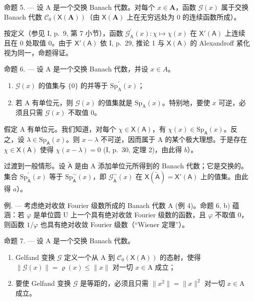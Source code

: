 命题 5. --- 设 A 是一个交换 Banach 代数。对每个 \(x \in \mathbf{A}\)，函数 \(\mathcal{G}(x)\) 属于交换 Banach 代数 \(\mathcal{C}_0(\mathsf{X}(\mathbf{A}))\)（由 \(\mathsf{X}(\mathbf{A})\) 上在无穷远处为 0 的连续函数所成）。

按定义（参见 I, p.~9, 第 7 小节），函数 \(\mathcal{G}_{\mathrm{A}}^{\prime}(x)\colon \chi \mapsto \chi (x)\) 在 \(\mathsf{X}'(\mathsf{A})\) 上连续且在 0 处取值 0。由于 \(\mathsf{X}'(\mathsf{A})\) 依 I, p.~29, 推论 1 与 \(\mathsf{X}(\mathsf{A})\) 的 Alexandroff 紧化视为同一，命题得证。

命题 6. --- 设 A 是一个交换 Banach 代数，并设 \(x \in A\)。

\begin{enumerate}
\def\labelenumi{\alph{enumi})}
\item
  \(\mathcal{G}(x)\) 的值集与 \(\{0\}\) 的并等于 \(\mathrm{Sp}_{\mathrm{A}}^{\prime}(x)\)；
\item
  若 A 有单位元，则 \(\mathcal{G}(x)\) 的值集就是 \(\mathrm{Sp}_{\mathrm{A}}(x)\)。特别地，要使 \(x\) 可逆，必须且只需 \(\mathcal{G}(x)\) 不取值 0。
\end{enumerate}

假定 A 有单位元。我们知道，对每个 \(\chi \in \mathsf{X}(\mathsf{A})\)，有 \(\chi(x) \in \mathrm{Sp}_{\mathsf{A}}(x)\)。反之，设 \(\lambda \in \mathrm{Sp}_{\mathsf{A}}(x)\)。则 \(x - \lambda\) 不可逆，因而属于 A 的某个极大理想。于是存在 \(\chi \in \mathsf{X}(\mathsf{A})\) 使得 \(\chi(x - \lambda) = 0\) (I, p.~30, 定理 2)，由此得 \(b\)）。

过渡到一般情形。设 \(\widetilde{\mathsf{A}}\) 是由 A 添加单位元所得到的 Banach 代数；它是交换的。集合 \(\mathrm{Sp}_{\widetilde{\mathsf{A}}}^{\prime}(x)\) 等于 \(\mathrm{Sp}_{\widetilde{\mathsf{A}}}^{\sim}(x)\)，即 \(\mathcal{G}_{\widetilde{\mathsf{A}}}^{\sim}(x)\) 在 \(\mathsf{X}(\widetilde{\mathsf{A}}) = \mathsf{X}'(\mathsf{A})\) 上的值集。由此得 \(a\)）。

例. --- 考虑绝对收敛 Fourier 级数所成的 Banach 代数 A (例 4)。命题 6, b) 蕴涵：若 \(\varphi\) 是单位圆 U 上一个具有绝对收敛 Fourier 级数的函数，且 \(\varphi\) 不取值 0，则函数 \(1/\varphi\) 也具有绝对收敛 Fourier 级数（“Wiener 定理”）。

命题 7. --- 设 A 是一个交换 Banach 代数。

\begin{enumerate}
\def\labelenumi{\alph{enumi})}
\item
  Gelfand 变换 \(\mathcal{G}\) 定义一个从 A 到 \(\mathcal{C}_0(\mathsf{X}(\mathsf{A}))\) 的态射，使得 \(\| \mathcal{G}(x)\| = \varrho (x)\leqslant \| x\|\) 对一切 \(x\in \mathrm{A}\) 成立；
\item
  要使 Gelfand 变换 \(\mathcal{G}\) 是等距的，必须且只需 \(\|x^{2}\|=\|x\|^{2}\) 对一切 \(x\in\mathrm{A}\) 成立。
\end{enumerate}

